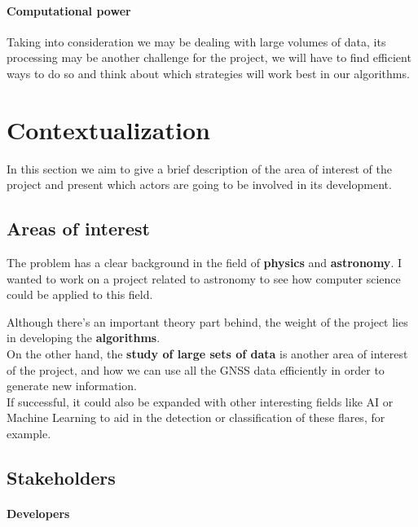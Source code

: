 \documentclass[12pt]{article}
\begin{document}
\paragraph{Computational power}

Taking into consideration we may be dealing with large volumes of data, its processing may be another challenge for the project, we will have to find efficient ways to do so and think about which strategies will work best in our algorithms.

\newpage
\section{Contextualization}

In this section we aim to give a brief description of the area of interest of the project and present which actors are going to be involved in its development.

\subsection{Areas of interest}

The problem has a clear background in the field of \textbf{physics} and \textbf{astronomy}. I wanted to work on a project related to astronomy to see how computer science could be applied to this field. 

Although there’s an important theory part behind, the weight of the project lies in developing the \textbf{algorithms}.\\

On the other hand, the \textbf{study of large sets of data} is another area of interest of the project, and how we can use all the GNSS data efficiently in order to generate new information.\\

If successful, it could also be expanded with other interesting fields like AI or Machine Learning to aid in the detection or classification of these flares, for example.

\subsection{Stakeholders}

\paragraph{Developers}
\end{document}
